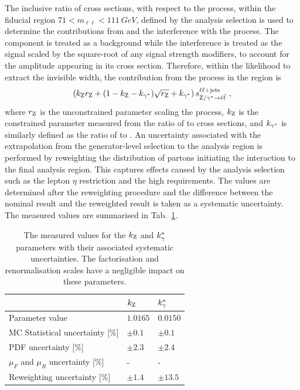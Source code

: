 %
The inclusive ratio of cross sections, with respect to the \IDYll process,
within the fiducial region ${71<m_{\ell\ell}<\SI{111}{GeV}}$, defined by the
analysis selection is used to determine the contributions from \Igstarll and
the interference with the \IZll process. The \Igstarll component is treated as
a background while the interference is treated as the \IZll signal scaled by
the square-root of any signal strength modifiers, to account for the \IZll
amplitude appearing in its cross section. Therefore, within the likelihood to extract the \PZ invisible width, the contribution from the \IDYll process in the \diellplusjets region is
%
\begin{equation}
    \left(k_{\mathrm{Z}}r_{\mathrm{Z}} + (1 - k_{\mathrm{Z}} - k_{\gamma^{*}})\sqrt{r_{\mathrm{Z}}} + k_{\gamma^{*}}\right)s_{{\mathrm{Z}/\gamma^{*}\rightarrow \ell\bar{\ell}}}^{\ell\ell+\mathrm{jets}}\ ,
\end{equation}
%
where $r_\mathrm{Z}$ is the unconstrained parameter scaling the \IZll process,
$k_{\mathrm{Z}}$ is the constrained parameter measured from the ratio of \IZll to
\IDYll cross sections, and $k_{\gamma^{*}}$ is similarly defined as the ratio of
\Igstarll to \IDYll. An uncertainty associated with the extrapolation from the
generator-level selection to the analysis region is performed by reweighting
the distribution of partons initiating the interaction to the final analysis
region. This captures effects caused by the analysis selection such as the
lepton $\eta$ restriction and the high \recoil requirements. The values are
determined after the reweighting procedure and the difference between the nominal
result and the reweighted result is taken as a systematic uncertainty. The
measured values are summarised in Tab.~\ref{tab:gstar-corrections}.

\begin{table}[htb]
    \centering
    \begin{tabular}{lll}
        \hline%
        & $k_\mathrm{Z}$ & $k_\gamma^{*}$ \\
        \hline
        Parameter value &  $1.0165$ & $0.0150$ \\
        MC Statistical uncertainty [\%] & $\pm 0.1$ & $\pm 0.1$ \\
        PDF uncertainty [\%] & $\pm 2.3$ & $\pm 2.4$ \\
        $\mu_F$ and $\mu_R$ uncertainty [\%] & - & - \\
        Reweighting uncertainty [\%] & $\pm 1.4$ & $\pm 13.5$ \\
        \hline%
    \end{tabular}
    \caption[Contributions to the \IDYll from the \IZll and \Igstarll processes.]{
        The measured values for the $k_\mathrm{Z}$ and $k_\gamma^{*}$ parameters with their associated systematic uncertainties. The factorisation and renormalisation scales have a negligible impact on these parameters.
    }
    \label{tab:gstar-corrections}
\end{table}


